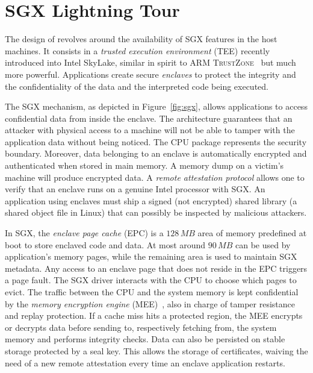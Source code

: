 \section{SGX Lightning Tour}\label{sec:background}

The design of \SYS{} revolves around the availability of SGX features in the host machines.
It consists in a \emph{trusted execution environment} (TEE) recently introduced into Intel SkyLake, similar in spirit to ARM \textsc{TrustZone}~\cite{arm2009security} but much more powerful.
Applications create secure \emph{enclaves} to protect the integrity and the confidentiality of the data and the interpreted code being executed. 

The SGX mechanism, as depicted in Figure~\ref{fig:sgx}, allows applications to access confidential data from inside the enclave. 
The architecture guarantees that an attacker with physical access to a machine will not be able to tamper with the application data without being noticed. 
The CPU package represents the security boundary. 
Moreover, data belonging to an enclave is automatically encrypted and authenticated when stored in main memory. 
A memory dump on a victim’s machine will produce encrypted data.
A \emph{remote attestation protocol} allows one to verify that an enclave runs on a genuine Intel processor with SGX.
An application using enclaves must ship a signed (not encrypted) shared library (a shared object file in Linux) that can possibly be inspected by malicious attackers.

In SGX, the \emph{enclave page cache} (EPC) is a $128\,MB$ area of memory predefined at boot to store enclaved code and data. 
At most around $90\,MB$ can be used by application’s memory pages, while the remaining area is used to maintain SGX metadata. 
Any access to an enclave page that does not reside in the EPC triggers a page fault.
The SGX driver interacts with the CPU to choose which pages to evict. 
The traffic between the CPU and the system memory is kept confidential by the \emph{memory encryption engine} (MEE)~\cite{gueron2016memory}, also in charge of tamper resistance and replay protection. 
If a cache miss hits a protected region, the MEE encrypts or decrypts data before sending to, respectively fetching from, the system memory and performs integrity checks. 
Data can also be persisted on stable storage protected by a seal key. 
This allows the storage of certificates, waiving the need of a new remote attestation every time an enclave application restarts.

